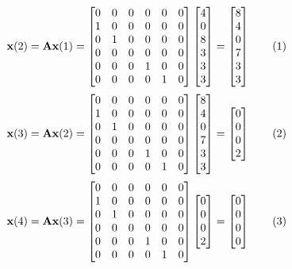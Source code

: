 \documentclass[12pt]{book}
\theoremstyle{plain}
\newcommand\addtag{\refstepcounter{equation}
\renewcommand{\labelenumii}{\theenumii}
\renewcommand{\theenumii}{\theenumi.\arabic{enumii}.}
\tag{\theequation}}
\begin{document}
\[
\textbf{x}(2)=\textbf{Ax}(1)=\A \xI = \xII \addtag
\]
\def \xIII {\begin{bmatrix}
		0 \\ 0 \\ 0 \\ 2
\end{bmatrix}}
\[
\textbf{x}(3)=\textbf{Ax}(2)=\A \xII = \xIII \addtag
\]
\def \xIV {\begin{bmatrix}
		0 \\ 0 \\ 0 \\ 0
\end{bmatrix}}
\[
\textbf{x}(4)=\textbf{Ax}(3)=\A \xIII = \xIV \addtag
\]
%



% 
 
\end{document}
